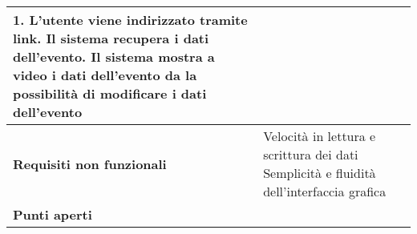 \begin{tabular} {|P{4.5cm}|P{11cm}|}
  1. L'utente viene indirizzato tramite link. Il sistema recupera i dati dell'evento. Il sistema mostra a video i dati dell'evento da la possibilità di modificare i dati dell'evento                                                                                                                                     \\
  \hline
  \textbf{Requisiti non funzionali} & Velocità in lettura e scrittura dei dati\linebreak
  Semplicità e fluidità dell'interfaccia grafica                                                                                                                                                                                         \\
  \hline
  \textbf{Punti aperti}             &                                                                                                                                                                                                    \\
  \hline
\end{tabular}
\hfill
\break

